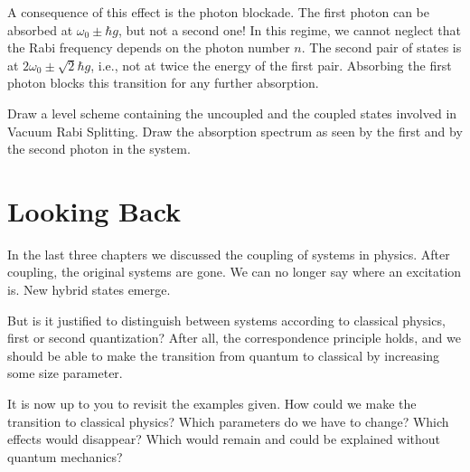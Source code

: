 A consequence of this effect is the photon blockade. The first photon can be absorbed at $\omega_0 \pm \hbar g$, but not a second one!  In this regime, we cannot neglect that the Rabi frequency depends on the photon number $n$. The second pair of states is at 
$2 \omega_0 \pm \sqrt{2} \hbar g$, i.e., not at twice the energy of the first pair. Absorbing the first photon blocks this transition for any further absorption.

\begin{questions}
\item Draw a level scheme containing the uncoupled and the coupled states involved in Vacuum Rabi Splitting. Draw the absorption spectrum as seen by the first and by the second photon in the system.
\end{questions}


\section{Looking Back}

In the last three chapters we discussed the coupling of systems in physics. After coupling, the original systems are gone. We can no longer say where an excitation is. New hybrid states emerge.

But is it justified to distinguish between systems according to classical physics, first or second quantization? After all, the correspondence principle holds, and we should be able to make the transition from quantum to classical by increasing some size parameter.

\begin{questions}
\item It is now up to you to revisit the examples given. How could we make the transition to classical physics? Which parameters do we have to change? Which effects would disappear? Which would remain and could be explained without quantum mechanics?
  \end{questions}
  
\printbibliography[segment=\therefsegment,heading=subbibliography]
